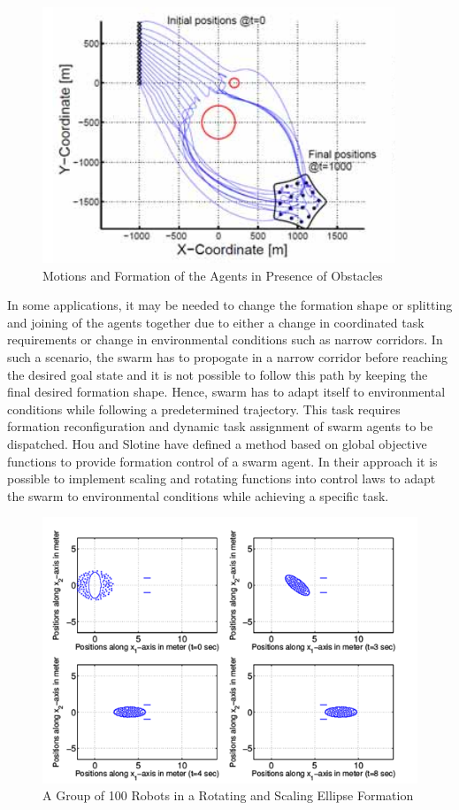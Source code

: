 \begin{figure}[H]
	\caption{Motions and Formation of the Agents in Presence of Obstacles \cite{17}} \label{samitha_obstacle}
	\centering
	\includegraphics[scale = 0.7]{samitha}
\end{figure} 

In some applications, it may be needed to change the formation shape or splitting and joining of the agents together due to either a change in coordinated task requirements or change in environmental conditions such as narrow corridors. In such a scenario, the swarm has to propogate in a narrow corridor before reaching the desired goal state and it is not possible to follow this path by keeping the final desired formation shape. Hence, swarm has to adapt itself to environmental conditions while following a predetermined trajectory. This task requires formation reconfiguration and dynamic task assignment of swarm agents to be dispatched. Hou and Slotine \cite{8} have defined a method based on global objective functions to provide formation control of a swarm agent. In their approach it is possible to implement scaling and rotating functions into control laws to adapt the swarm to environmental conditions while achieving a specific task. 

\begin{figure}[H]
	\caption{A Group of 100 Robots in a Rotating and Scaling Ellipse Formation \cite{8}} \label{slotine_fig_ref}
	\centering
	\includegraphics[scale = 1]{slotine}
\end{figure} 

